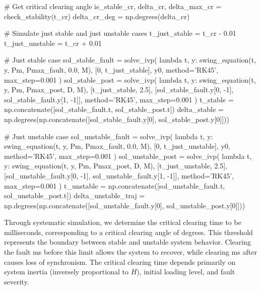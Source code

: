 \documentclass[11pt,a4paper]{article}
\begin{document}
\begin{pycode}
# Get critical clearing angle
is_stable_cr, delta_cr, delta_max_cr = check_stability(t_cr)
delta_cr_deg = np.degrees(delta_cr)

# Simulate just stable and just unstable cases
t_just_stable = t_cr - 0.01
t_just_unstable = t_cr + 0.01

# Just stable case
sol_stable_fault = solve_ivp(
    lambda t, y: swing_equation(t, y, Pm, Pmax_fault, 0.0, M),
    [0, t_just_stable], y0, method='RK45', max_step=0.001
)
sol_stable_post = solve_ivp(
    lambda t, y: swing_equation(t, y, Pm, Pmax_post, D, M),
    [t_just_stable, 2.5], [sol_stable_fault.y[0, -1], sol_stable_fault.y[1, -1]],
    method='RK45', max_step=0.001
)
t_stable = np.concatenate([sol_stable_fault.t, sol_stable_post.t])
delta_stable = np.degrees(np.concatenate([sol_stable_fault.y[0], sol_stable_post.y[0]]))

# Just unstable case
sol_unstable_fault = solve_ivp(
    lambda t, y: swing_equation(t, y, Pm, Pmax_fault, 0.0, M),
    [0, t_just_unstable], y0, method='RK45', max_step=0.001
)
sol_unstable_post = solve_ivp(
    lambda t, y: swing_equation(t, y, Pm, Pmax_post, D, M),
    [t_just_unstable, 2.5], [sol_unstable_fault.y[0, -1], sol_unstable_fault.y[1, -1]],
    method='RK45', max_step=0.001
)
t_unstable = np.concatenate([sol_unstable_fault.t, sol_unstable_post.t])
delta_unstable_traj = np.degrees(np.concatenate([sol_unstable_fault.y[0], sol_unstable_post.y[0]]))
\end{pycode}

Through systematic simulation, we determine the critical clearing time to be  milliseconds, corresponding to a critical clearing angle of  degrees. This threshold represents the boundary between stable and unstable system behavior. Clearing the fault  ms before this limit allows the system to recover, while clearing  ms after causes loss of synchronism. The critical clearing time depends primarily on system inertia (inversely proportional to $H$), initial loading level, and fault severity.
\end{document}
